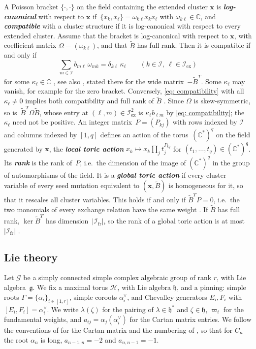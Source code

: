 \documentclass[a4paper]{amsart}
\numberwithin{equation}{section}
\theoremstyle{definition}
\theoremstyle{remark}
\newcommand{\bbC}{\mathbb{C}}
\newcommand{\mfh}{\mathfrak{h}}
\newcommand{\mfg}{\mathfrak{g}}
\newcommand{\mcG}{\mathcal{G}}
\newcommand{\mcH}{\mathcal{H}}
\newcommand{\mcI}{\mathcal{I}}
\newcommand{\bx}{\mathbf{x}}
\newcommand{\tB}{\widetilde{B}}
\newcommand{\ex}{\mathrm{ex}}
\newcommand{\fr}{\mathrm{fr}}
\newcommand{\newword}[1]{\textbf{\emph{#1}}}
\begin{document}
A Poisson bracket $\{\cdot,\cdot\}$ on the field containing the extended cluster $\bx$ is \newword{log-canonical} with respect to $\bx$ if~$\{x_k,x_\ell\}=\omega_{k\ell}x_kx_\ell$ with $\omega_{k\ell}\in\bbC$, and \newword{compatible} with a cluster structure if it is log-canonical with respect to every extended cluster.
Assume that the bracket is log-canonical with respect to $\bx$, with coefficient matrix $\Omega=(\omega_{k\ell})$, and that $\tB$ has full rank.
Then it is compatible if and only if
\begin{equation}
  \label{eq: compatibility}
  \sum_{m\in\mcI}b_{m\ell}\,\omega_{mk}=\delta_{k\ell}\,\kappa_\ell
  \qquad(k\in\mcI,\ \ell\in\mcI_\ex)
\end{equation}
for some $\kappa_\ell\in\bbC$ \cite[Proposition~2.2]{GSV11}, see also \cite[Theorem~4.5]{GSV10}, stated there for the wide matrix~$-\tB^T$.
Some $\kappa_\ell$ may vanish, for example for the zero bracket.
Conversely, \eqref{eq: compatibility} with all $\kappa_\ell\neq0$ implies both compatibility and full rank of $\tB$ \cite[Proposition~2.5]{GSV18dd}.
Since $\Omega$ is skew-symmetric, so is~$\tB^T\Omega\tB$, whose entry at $(\ell,m)\in\mcI_\ex^2$ is $\kappa_\ell b_{\ell m}$ by \eqref{eq: compatibility}; the $\kappa_\ell$ need not be positive.
An integer matrix~$P=(P_{kj})$ with rows indexed by $\mcI$ and columns indexed by $[1,q]$ defines an action of the torus~$(\bbC^*)^q$ on the field generated by $\bx$, the \newword{local toric action} $x_k\mapsto x_k\prod_jt_j^{P_{kj}}$ for $(t_1,\dots,t_q)\in(\bbC^*)^q$.
Its \newword{rank} is the rank of~$P$, i.e.\ the dimension of the image of $(\bbC^*)^q$ in the group of automorphisms of the field.
It is a \newword{global toric action} if every cluster variable of every seed mutation equivalent to $(\bx,\tB)$ is homogeneous for it, so that it rescales all cluster variables.
This holds if and only if $\tB^TP=0$, i.e.\ the two monomials of every exchange relation have the same weight \cite[Lemma~5.3]{GSV10}.
If $\tB$ has full rank, $\ker\tB^T$ has dimension~$|\mcI_\fr|$, so the rank of a global toric action is at most $|\mcI_\fr|$ \cite[Section~2.2]{GSV11}.

\subsection{Lie theory}
\label{sec: Lie}
Let $\mcG$ be a simply connected simple complex algebraic group of rank $r$, with Lie algebra~$\mfg$.
We fix a maximal torus $\mcH$, with Lie algebra $\mfh$, and a pinning: simple roots $\Gamma=\{\alpha_i\}_{i\in[1,r]}$, simple coroots $\alpha_i^\vee$, and Chevalley generators $E_i,F_i$ with $[E_i,F_i]=\alpha_i^\vee$.
We write $\lambda(\zeta)$ for the pairing of $\lambda\in\mfh^*$ and $\zeta\in\mfh$, $\varpi_i$ for the fundamental weights, and $a_{ij}=\alpha_j(\alpha_i^\vee)$ for the Cartan matrix entries.
We follow the conventions of \cite[Section~1.1]{Kac90} for the Cartan matrix and the numbering of \cite[Chapter~VI, Plate~III]{Bou02}, so that for $C_n$ the root $\alpha_n$ is long, $a_{n-1,n}=-2$ and $a_{n,n-1}=-1$.
\end{document}
